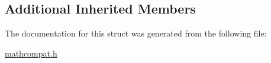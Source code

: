 \subsection*{Additional Inherited Members}


The documentation for this struct was generated from the following file\+:\begin{DoxyCompactItemize}
\item 
\hyperlink{mathcompat_8h}{mathcompat.\+h}\end{DoxyCompactItemize}
